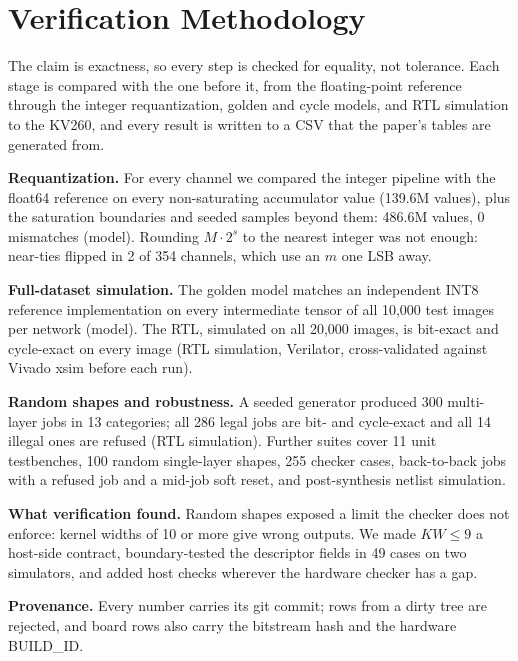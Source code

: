 \section{Verification Methodology}\label{sec:verif}
The claim is exactness, so every step is checked for equality, not
tolerance. Each stage is compared with the one before it, from the
floating-point reference through the integer requantization, golden and
cycle models, and RTL simulation to the KV260, and every result is written
to a CSV that the paper's tables are generated from.

\textbf{Requantization.} For every channel we compared the integer pipeline
with the float64 reference on every non-saturating accumulator value
(139.6M values), plus the saturation boundaries and seeded samples beyond
them: 486.6M values, 0 mismatches (model).
Rounding $M \cdot 2^s$ to the nearest integer was not enough: near-ties
flipped in 2 of 354 channels, which use an $m$ one LSB away.

\textbf{Full-dataset simulation.} The golden model matches an independent INT8
reference implementation on every intermediate tensor of all 10,000 test images per
network (model). The RTL, simulated on all 20,000 images, is bit-exact and
cycle-exact on every image (RTL simulation, Verilator, cross-validated
against Vivado xsim before each run).

\textbf{Random shapes and robustness.} A seeded generator produced 300
multi-layer jobs in 13 categories; all 286 legal jobs are bit- and
cycle-exact and all 14 illegal ones are refused (RTL simulation). Further
suites cover 11 unit testbenches, 100 random single-layer shapes, 255
checker cases, back-to-back jobs with a refused job and a mid-job soft
reset, and post-synthesis netlist simulation.

\textbf{What verification found.} Random shapes exposed a limit the checker
does not enforce: kernel widths of 10 or more give wrong outputs. We made
$KW \le 9$ a host-side contract, boundary-tested the descriptor fields in
49 cases on two simulators, and added host checks wherever the hardware
checker has a gap. %

\textbf{Provenance.} Every number carries its git commit; rows from a dirty
tree are rejected, and board rows also carry the bitstream hash and the
hardware BUILD\_ID. %
